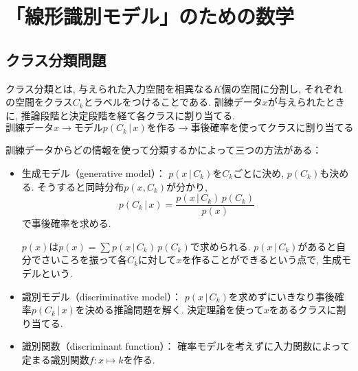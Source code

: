 \setcounter{chapter}{3}
\chapter{「線形識別モデル」のための数学}
\section{クラス分類問題}
クラス分類とは, 与えられた入力空間を相異なる$K$個の空間に分割し, それぞれの空間をクラス$C_k$とラベルをつけることである.
訓練データ$x$が与えられたときに, 推論段階と決定段階を経て各クラスに割り当てる.
$$
\text{訓練データ}x
\rightarrow \text{モデル$p(C_k\,|\,x)$を作る}
\rightarrow \text{事後確率を使ってクラスに割り当てる}
$$

訓練データからどの情報を使って分類するかによって三つの方法がある：
\begin{itemize}
\item 生成モデル（generative model）：
$p(x\,|\,C_k)$を$C_k$ごとに決め, $p(C_k)$も決める. そうすると同時分布$p(x, C_k)$が分かり,
$$
p(C_k\,|\,x)=\frac{p(x\,|\,C_k)\,p(C_k)}{p(x)}
$$
で事後確率を求める.

$p(x)$は$p(x)=\sum p(x\,|\,C_k)\,p(C_k)$で求められる.
$p(x\,|\,C_k)$があると自分でさいころを振って各$C_k$に対して$x$を作ることができるという点で,
生成モデルという.

\item 識別モデル（discriminative model）：
$p(x\,|\,C_k)$を求めずにいきなり事後確率$p(C_k\,|\,x)$を決める推論問題を解く.
決定理論を使って$x$をあるクラスに割り当てる.

\item 識別関数（discriminant function）：
確率モデルを考えずに入力関数によって定まる識別関数$f\colon x \mapsto k$を作る.
\end{itemize}

